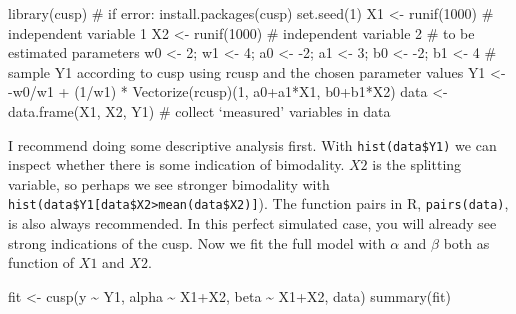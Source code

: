 \documentclass[
  a4paper,
  DIV=11,
  numbers=noendperiod,
  oneside]{scrreprt}
\newenvironment{Shaded}{}{}
\newcommand{\CommentTok}[1]{\textcolor[rgb]{0.42,0.45,0.49}{#1}}
\newcommand{\DecValTok}[1]{\textcolor[rgb]{0.00,0.36,0.77}{#1}}
\newcommand{\FunctionTok}[1]{\textcolor[rgb]{0.44,0.26,0.76}{#1}}
\newcommand{\NormalTok}[1]{\textcolor[rgb]{0.14,0.16,0.18}{#1}}
\newcommand{\OtherTok}[1]{\textcolor[rgb]{0.44,0.26,0.76}{#1}}
\newcommand{\SpecialCharTok}[1]{\textcolor[rgb]{0.00,0.36,0.77}{#1}}
\begin{document}
\begin{Shaded}
\begin{Highlighting}[]
\FunctionTok{library}\NormalTok{(cusp) }\CommentTok{\# if error: install.packages(\textquotesingle{}cusp\textquotesingle{})}
\FunctionTok{set.seed}\NormalTok{(}\DecValTok{1}\NormalTok{)}
\NormalTok{X1 }\OtherTok{\textless{}{-}} \FunctionTok{runif}\NormalTok{(}\DecValTok{1000}\NormalTok{) }\CommentTok{\# independent variable 1}
\NormalTok{X2 }\OtherTok{\textless{}{-}} \FunctionTok{runif}\NormalTok{(}\DecValTok{1000}\NormalTok{) }\CommentTok{\# independent variable 2}
\CommentTok{\# to be estimated parameters}
\NormalTok{w0 }\OtherTok{\textless{}{-}} \DecValTok{2}\NormalTok{; w1 }\OtherTok{\textless{}{-}} \DecValTok{4}\NormalTok{; a0 }\OtherTok{\textless{}{-}} \SpecialCharTok{{-}}\DecValTok{2}\NormalTok{; a1 }\OtherTok{\textless{}{-}} \DecValTok{3}\NormalTok{; b0 }\OtherTok{\textless{}{-}} \SpecialCharTok{{-}}\DecValTok{2}\NormalTok{; b1 }\OtherTok{\textless{}{-}} \DecValTok{4} 
\CommentTok{\# sample Y1 according to cusp using rcusp and the chosen parameter values}
\NormalTok{Y1 }\OtherTok{\textless{}{-}} \SpecialCharTok{{-}}\NormalTok{w0}\SpecialCharTok{/}\NormalTok{w1 }\SpecialCharTok{+}\NormalTok{ (}\DecValTok{1}\SpecialCharTok{/}\NormalTok{w1) }\SpecialCharTok{*} \FunctionTok{Vectorize}\NormalTok{(rcusp)(}\DecValTok{1}\NormalTok{, a0}\SpecialCharTok{+}\NormalTok{a1}\SpecialCharTok{*}\NormalTok{X1, b0}\SpecialCharTok{+}\NormalTok{b1}\SpecialCharTok{*}\NormalTok{X2) }
\NormalTok{data }\OtherTok{\textless{}{-}} \FunctionTok{data.frame}\NormalTok{(X1, X2, Y1) }\CommentTok{\# collect ‘measured’ variables in data}
\end{Highlighting}
\end{Shaded}

I recommend doing some descriptive analysis first. With
\texttt{hist(data\$Y1)} we can inspect whether there is some indication
of bimodality. \(X2\) is the splitting variable, so perhaps we see
stronger bimodality with
\texttt{hist(data\$Y1{[}data\$X2\textgreater{}mean(data\$X2){]}}). The
function pairs in R, \texttt{pairs(data)}, is also always recommended.
In this perfect simulated case, you will already see strong indications
of the cusp. Now we fit the full model with \(\alpha\) and \(\beta\)
both as function of \(X1\) and \(X2\).

\begin{Shaded}
\begin{Highlighting}[]
\NormalTok{fit }\OtherTok{\textless{}{-}} \FunctionTok{cusp}\NormalTok{(y }\SpecialCharTok{\textasciitilde{}}\NormalTok{ Y1, alpha }\SpecialCharTok{\textasciitilde{}}\NormalTok{ X1}\SpecialCharTok{+}\NormalTok{X2, beta }\SpecialCharTok{\textasciitilde{}}\NormalTok{ X1}\SpecialCharTok{+}\NormalTok{X2, data) }
\FunctionTok{summary}\NormalTok{(fit) }
\end{Highlighting}
\end{Shaded}
\end{document}

